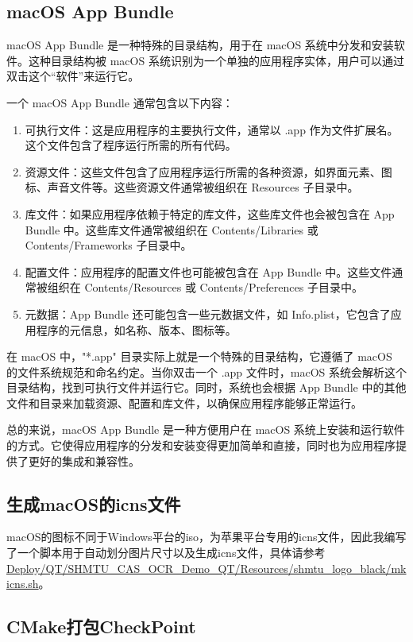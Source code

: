 \subsection{macOS App Bundle}

macOS App Bundle 是一种特殊的目录结构，用于在 macOS 系统中分发和安装软件。这种目录结构被 macOS 系统识别为一个单独的应用程序实体，用户可以通过双击这个“软件”来运行它。

一个 macOS App Bundle 通常包含以下内容：

\begin{enumerate}
	\item 可执行文件：这是应用程序的主要执行文件，通常以 .app 作为文件扩展名。这个文件包含了程序运行所需的所有代码。
	\item 资源文件：这些文件包含了应用程序运行所需的各种资源，如界面元素、图标、声音文件等。这些资源文件通常被组织在 Resources 子目录中。
	\item 库文件：如果应用程序依赖于特定的库文件，这些库文件也会被包含在 App Bundle 中。这些库文件通常被组织在 Contents/Libraries 或 Contents/Frameworks 子目录中。
	\item 配置文件：应用程序的配置文件也可能被包含在 App Bundle 中。这些文件通常被组织在 Contents/Resources 或 Contents/Preferences 子目录中。
	\item 元数据：App Bundle 还可能包含一些元数据文件，如 Info.plist，它包含了应用程序的元信息，如名称、版本、图标等。
\end{enumerate}

在 macOS 中，"*.app" 目录实际上就是一个特殊的目录结构，它遵循了 macOS 的文件系统规范和命名约定。当你双击一个 .app 文件时，macOS 系统会解析这个目录结构，找到可执行文件并运行它。同时，系统也会根据 App Bundle 中的其他文件和目录来加载资源、配置和库文件，以确保应用程序能够正常运行。

总的来说，macOS App Bundle 是一种方便用户在 macOS 系统上安装和运行软件的方式。它使得应用程序的分发和安装变得更加简单和直接，同时也为应用程序提供了更好的集成和兼容性。

\subsection{生成macOS的icns文件}

macOS的图标不同于Windows平台的iso，为苹果平台专用的icns文件，因此我编写了一个脚本用于自动划分图片尺寸以及生成icns文件，具体请参考\url{Deploy/QT/SHMTU_CAS_OCR_Demo_QT/Resources/shmtu_logo_black/mkicns.sh}。

\subsection{CMake打包CheckPoint}

